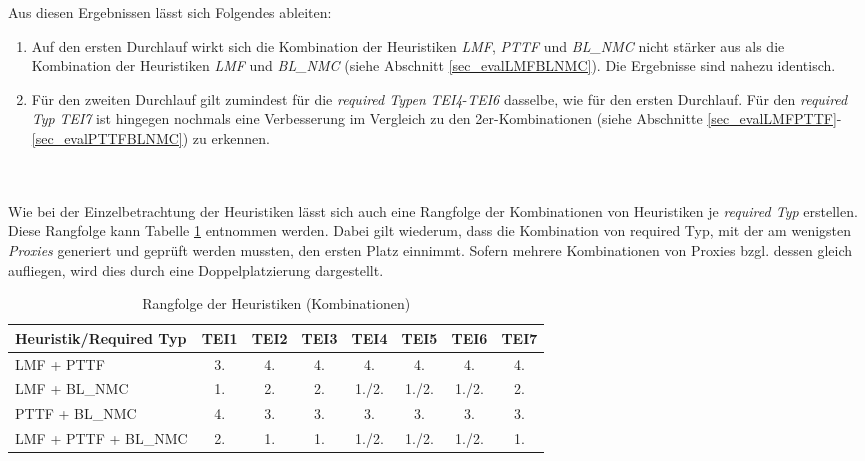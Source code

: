 \begin{multicols}{2}
\columnbreak
{}
\end{multicols}
\pagebreak
\noindent
Aus diesen Ergebnissen lässt sich Folgendes ableiten:
\begin{enumerate}
\item Auf den ersten Durchlauf wirkt sich die Kombination der \Gls{Heuristik}en \emph{LMF}, \emph{PTTF} und \emph{BL\_NMC} nicht stärker aus als die Kombination der \Gls{Heuristik}en \emph{LMF} und \emph{BL\_NMC} (siehe Abschnitt \ref{sec_evalLMFBLNMC}). Die Ergebnisse sind nahezu identisch.


\item Für den zweiten Durchlauf gilt zumindest für die \emph{required Typen} \emph{TEI4}-\emph{TEI6} dasselbe, wie für den ersten Durchlauf. Für den \emph{required Typ} \emph{TEI7} ist hingegen nochmals eine Verbesserung im Vergleich zu den 2er-Kombinationen (siehe Abschnitte \ref{sec_evalLMFPTTF}-\ref{sec_evalPTTFBLNMC}) zu erkennen.
\end{enumerate}
\noindent
\\\\
Wie bei der Einzelbetrachtung der \Gls{Heuristik}en lässt sich auch eine Rangfolge der Kombinationen von \Gls{Heuristik}en je \emph{required Typ} erstellen. Diese Rangfolge kann Tabelle \ref{tab_rankingCombi} entnommen werden. Dabei gilt wiederum, dass die Kombination von required Typ, mit der am wenigsten \emph{Proxies} generiert und geprüft werden mussten, den ersten Platz einnimmt. Sofern mehrere Kombinationen von Proxies bzgl. dessen gleich aufliegen, wird dies durch eine Doppelplatzierung dargestellt.
\begin{table}[!h]
\centering
\begin{tabular}{|l|c|c|c|c|c|c|c|}
\hline
\hline
\textbf{Heuristik/Required Typ} & \textbf{TEI1} & \textbf{TEI2}& \textbf{TEI3}& \textbf{TEI4}& \textbf{TEI5}& \textbf{TEI6}& \textbf{TEI7}\\
\hline
\hline
LMF + PTTF &3.&4.&4.&4.&4.&4.&4.\\
\hline
LMF + BL\_NMC &1. &2.&2.&1./2.&1./2.&1./2.&2. \\
\hline
PTTF + BL\_NMC &4. &3.&3.&3.&3.&3.& 3.\\
\hline
LMF + PTTF + BL\_NMC &2. &1. &1. & 1./2.&1./2.&1./2.&1.\\
\hline
\hline
\end{tabular}
\caption{Rangfolge der Heuristiken (Kombinationen)}
\label{tab_rankingCombi}
\end{table}
